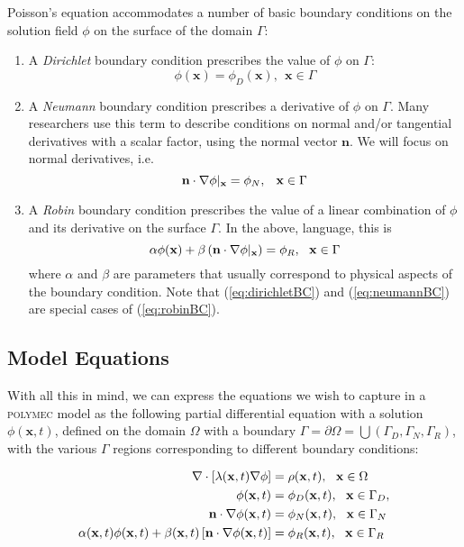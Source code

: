 \documentclass[12pt]{article}
\newcommand{\labelEq}[1]{\label{eq:#1}}
\newcommand{\refEq}[1]{(\ref{eq:#1})}
\newcommand{\polymec}{\textsc{polymec} }
\renewcommand{\vec}[1]{\mathbf{#1}}
\newcommand{\diverg}[1]{\nabla\cdot#1}
\newcommand{\grad}[1]{\nabla#1}
\begin{document}
Poisson's equation accommodates a number of basic boundary conditions on the 
solution field $\phi$ on the surface of the domain $\Gamma$:

\begin{enumerate}
 \item A {\em Dirichlet} boundary condition prescribes the value of $\phi$ on $\Gamma$:
 \begin{equation}
 \phi(\vec{x}) = \phi_D(\vec{x}), ~~\vec{x} \in \Gamma \labelEq{dirichletBC}
 \end{equation}
 \item A {\em Neumann} boundary condition prescribes a derivative of $\phi$ on $\Gamma$.
       Many researchers use this term to describe conditions on normal and/or tangential 
       derivatives with a scalar factor, using the normal vector $\vec{n}$. We will focus on normal derivatives, i.e.
 \begin{equation}
 \vec{n}\cdot\grad{\phi}\large|_\vec{x} = \phi_N, ~~\vec{x} \in \Gamma \labelEq{neumannBC}
 \end{equation}
 \item A {\em Robin} boundary condition prescribes the value of a linear combination of $\phi$ 
       and its derivative on the surface $\Gamma$. In the above, language, this is
 \begin{equation}
 \alpha\phi(\vec{x}) + \beta\left(\vec{n}\cdot\grad{\phi}\large|_\vec{x}\right) = \phi_R, ~~\vec{x} \in \Gamma \labelEq{robinBC}
 \end{equation}
 \noindent
 where $\alpha$ and $\beta$ are parameters that usually correspond to physical aspects of the 
 boundary condition. Note that \refEq{dirichletBC} and \refEq{neumannBC} are special cases of 
 \refEq{robinBC}.
\end{enumerate}

\subsection*{Model Equations}

With all this in mind, we can express the equations we wish to capture in a \polymec model 
as the following partial differential equation with a solution $\phi(\vec{x}, t)$, 
defined on the domain $\Omega$ with a boundary $\Gamma = \partial\Omega = \bigcup(\Gamma_D, \Gamma_N, \Gamma_R)$, 
with the various $\Gamma$ regions corresponding to different boundary conditions:

\begin{align}
\diverg\left[\lambda(\vec{x}, t)\grad{\phi}\right] &= \rho(\vec{x}, t), ~~\vec{x} \in \Omega \labelEq{modelEq} \\
\phi(\vec{x}, t) &= \phi_D(\vec{x}, t), ~~\vec{x} \in \Gamma_D, \notag \\
\vec{n}\cdot\grad{\phi(\vec{x}, t)} &= \phi_N(\vec{x}, t), ~~\vec{x} \in \Gamma_N \notag \\
\alpha(\vec{x}, t)\phi(\vec{x}, t) + \beta(\vec{x}, t)\left[\vec{n}\cdot\grad{\phi(\vec{x}, t)}\right] &= \phi_R(\vec{x}, t), ~~\vec{x} \in \Gamma_R \notag
\end{align}
\end{document}
